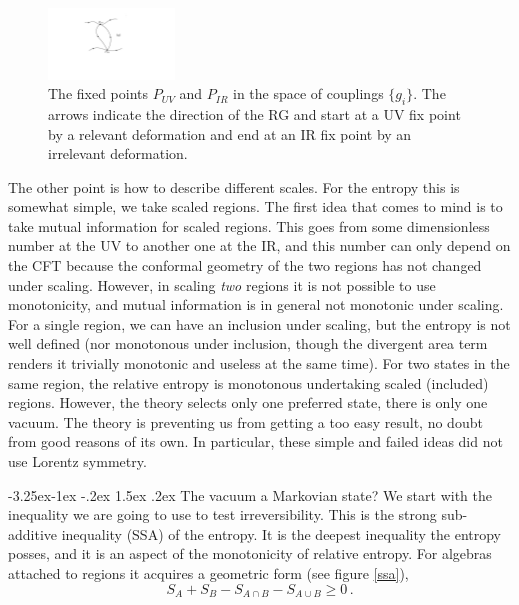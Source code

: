 \documentclass[11pt,a4paper]{article}
\makeatletter
\renewcommand\subsection{\@startsection{subsection}{2}{\z@}%
                                   {-3.25ex\@plus -1ex \@minus -.2ex}%
                                     {1.5ex \@plus .2ex}%
                                     {\normalfont\bfseries}}
\numberwithin{equation}{section}
\newcommand{\be}{\begin{equation}}
\newcommand{\ee}{\end{equation}}
\makeatother
\begin{document}
\begin{figure}[t]
\begin{center}  
\includegraphics[width=0.3\textwidth]{rg.pdf}
\captionsetup{width=0.9\textwidth}
\caption{The fixed points $P_{UV}$ and $P_{IR}$ in the space of couplings $\{g_i\}$. The arrows indicate the direction of the RG and start at a UV fix point by a relevant deformation and end at an IR fix point by an irrelevant deformation.}
\label{rg}
\end{center}  
\end{figure}

The other point is how to describe different scales. For the entropy this is somewhat simple, we take scaled regions. The first idea that comes to mind is to take mutual information for scaled regions. This goes from some dimensionless number at the UV to another one at the IR, and this number can only depend on the CFT because the conformal geometry of the two regions has not changed under scaling. However, in scaling {\sl two} regions it is not possible to use monotonicity, and mutual information is in general not monotonic under scaling. For a single region, we can have an inclusion under scaling, but the entropy is not well defined (nor monotonous under inclusion, though the divergent area term renders it trivially monotonic and useless at the same time). For two states in the same region, the relative entropy is monotonous undertaking scaled (included) regions. However, the theory selects only one preferred state, there is only one vacuum. The theory is preventing us from getting a too easy result, no doubt from good reasons of its own. In particular, these simple and failed ideas did not use Lorentz symmetry.     

\subsection{The vacuum a Markovian state?}
We start with the inequality we are going to use to test irreversibility. This is the strong sub-additive inequality (SSA) of the entropy. It is the deepest inequality the entropy posses, and it is an aspect of the monotonicity of relative entropy. For algebras attached to regions it acquires a geometric form (see figure \ref{ssa}),
\be\label{markov0}
S_A+S_B-S_{A\cap B}-S_{A\cup B}\ge 0\,. 
\ee
\end{document}

